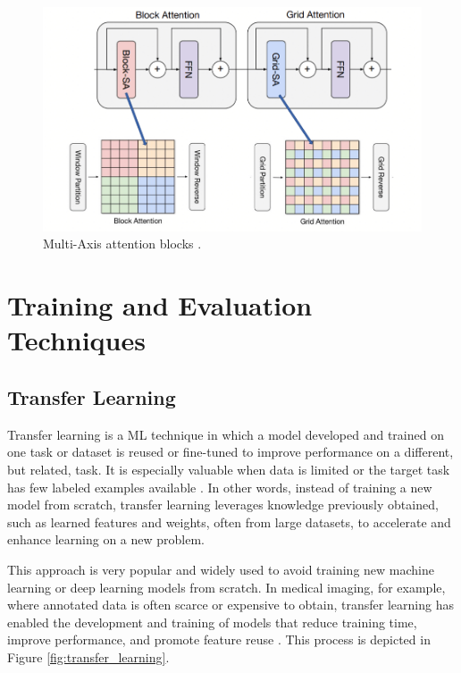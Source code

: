 \documentclass[a4paper,10pt]{book}
\begin{document}
\begin{figure}[h!]
    \centering
    \includegraphics[width=0.6\linewidth]{reports//assets/multi_axis_attention.png}
    \caption[Multi-Axis Attention Blocks]{Multi-Axis attention blocks \cite{noauthor_maxvit-unet_2024}.}
    \label{fig:multi_axis_attention}
\end{figure}


\section{Training and Evaluation Techniques}
\subsection{Transfer Learning}

Transfer learning is a ML technique in which a model developed and trained on one task or dataset is reused or fine-tuned to improve performance on a different, but related, task. It is especially valuable when data is limited or the target task has few labeled examples available \cite{murel_what_2024}. In other words, instead of training a new model from scratch, transfer learning leverages knowledge previously obtained, such as learned features and weights, often from large datasets, to accelerate and enhance learning on a new problem.

This approach is very popular and widely used to avoid training new machine learning or deep learning models from scratch. In medical imaging, for example, where annotated data is often scarce or expensive to obtain, transfer learning has enabled the development and training of models that reduce training time, improve performance, and promote feature reuse \cite{matsoukas_what_2022}. This process is depicted in Figure \ref{fig:transfer_learning}.
\end{document}
